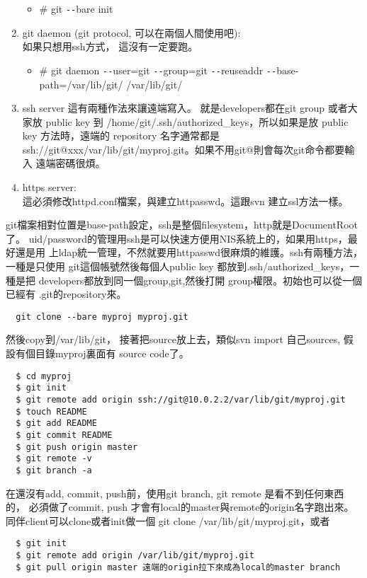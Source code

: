 \begin{enumerate}
\begin{itemize}
        \item \# git \verb=--=bare init
      \end{itemize}
    \item git daemon (git protocol, 可以在兩個人間使用吧):\\
      如果只想用ssh方式， 這沒有一定要跑。\\
      \begin{itemize}
        \item \# git daemon \verb=--=user=git \verb=--=group=git \verb=--=reuseaddr \verb=--=base-path=/var/lib/git/ /var/lib/git/
      \end{itemize}
    \item ssh server 這有兩種作法來讓遠端寫入。 就是developers都在git group
      或者大家放 public key 到 /home/git/.ssh/authorized\_keys，所以如果是放
      public key 方法時，遠端的 repository 名字通常都是
      ssh://git@xxx/var/lib/git/myproj.git。如果不用git@則會每次git命令都要輸入
      遠端密碼很煩。
    \item https server:\\
      這必須修改httpd.conf檔案，與建立httpasswd。這跟svn 建立ssl方法一樣。
  \end{enumerate}
  git檔案相對位置是base-path設定，ssh是整個filesystem，http就是DocumentRoot了。
  uid/password的管理用ssh是可以快速方便用NIS系統上的，如果用https，最好還是用
  上ldap統一管理，不然就要用httpasswd很麻煩的維護。ssh有兩種方法，一種是只使用
  git這個帳號然後每個人public key 都放到.ssh/authorized\_keys，一種是把
  developers都放到同一個group,git,然後打開 group權限。初始也可以從一個已經有
  .git的repository來。
  \begin{verbatim}
  git clone --bare myproj myproj.git
  \end{verbatim}
  然後copy到/var/lib/git， 接著把source放上去，類似svn import 自己sources,
  假設有個目錄myproj裏面有 source code了。
  \begin{verbatim}
  $ cd myproj
  $ git init
  $ git remote add origin ssh://git@10.0.2.2/var/lib/git/myproj.git
  $ touch README
  $ git add README
  $ git commit README
  $ git push origin master
  $ git remote -v
  $ git branch -a
  \end{verbatim}
  在還沒有add, commit, push前，使用git branch, git remote 是看不到任何東西的，
  必須做了commit, push 才會有local的master與remote的origin名字跑出來。
  同伴client可以clone或者init做一個 git clone /var/lib/git/myproj.git，或者
  \begin{verbatim}
  $ git init
  $ git remote add origin /var/lib/git/myproj.git
  $ git pull origin master 遠端的origin拉下來成為local的master branch
  \end{verbatim}
